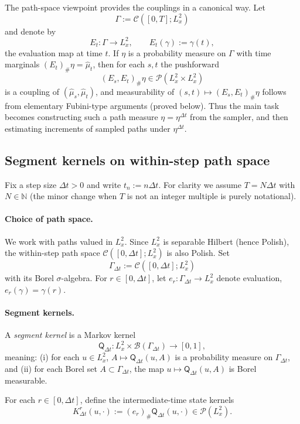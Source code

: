 \documentclass{article}
\numberwithin{equation}{section}
\theoremstyle{plain}
\theoremstyle{definition}
\theoremstyle{remark}
\newcommand{\N}{\mathbb{N}}
\newcommand{\Pcal}{\mathcal{P}}
\newcommand{\Ccal}{\mathcal{C}}
\begin{document}
The path-space viewpoint provides the couplings in a canonical way. Let
\[
\Gamma:=\Ccal([0,T];L^2_x)
\]
and denote by
\[
E_t:\Gamma\to L^2_x,\qquad E_t(\gamma):=\gamma(t),
\]
the evaluation map at time $t$. If $\eta$ is a probability measure on $\Gamma$ with time marginals
$(E_t)_\#\eta=\widehat\mu_t$, then for each $s,t$ the pushforward
\[
(E_s,E_t)_\#\eta\in \Pcal(L^2_x\times L^2_x)
\]
is a coupling of $(\widehat\mu_s,\widehat\mu_t)$, and measurability of $(s,t)\mapsto (E_s,E_t)_\#\eta$ follows from
elementary Fubini-type arguments (proved below). Thus the main task becomes constructing such a path measure
$\eta=\eta^{\Delta t}$ from the sampler, and then estimating increments of sampled paths under $\eta^{\Delta t}$.

\subsection{Segment kernels on within-step path space}

Fix a step size $\Delta t>0$ and write $t_n:=n\Delta t$. For clarity we assume $T=N\Delta t$ with $N\in\N$
(the minor change when $T$ is not an integer multiple is purely notational).

\paragraph{Choice of path space.}
We work with paths valued in $L^2_x$. Since $L^2_x$ is separable Hilbert (hence Polish), the within-step path space
$\Ccal([0,\Delta t];L^2_x)$ is also Polish. Set
\[
\Gamma_{\Delta t}:=\Ccal([0,\Delta t];L^2_x)
\]
with its Borel $\sigma$-algebra. For $r\in[0,\Delta t]$, let $e_r:\Gamma_{\Delta t}\to L^2_x$ denote evaluation,
$e_r(\gamma)=\gamma(r)$.

\paragraph{Segment kernels.}
A \emph{segment kernel} is a Markov kernel
\[
\mathsf{Q}_{\Delta t}:L^2_x\times\mathcal B(\Gamma_{\Delta t})\to[0,1],
\]
meaning:
(i) for each $u\in L^2_x$, $A\mapsto \mathsf{Q}_{\Delta t}(u,A)$ is a probability measure on $\Gamma_{\Delta t}$, and
(ii) for each Borel set $A\subset\Gamma_{\Delta t}$, the map $u\mapsto \mathsf{Q}_{\Delta t}(u,A)$ is Borel measurable.

For each $r\in[0,\Delta t]$, define the intermediate-time state kernels
\begin{equation}\label{eq:intermediate-kernels}
K^{r}_{\Delta t}(u,\cdot):=(e_r)_\#\mathsf{Q}_{\Delta t}(u,\cdot)\in \Pcal(L^2_x).
\end{equation}
\end{document}
